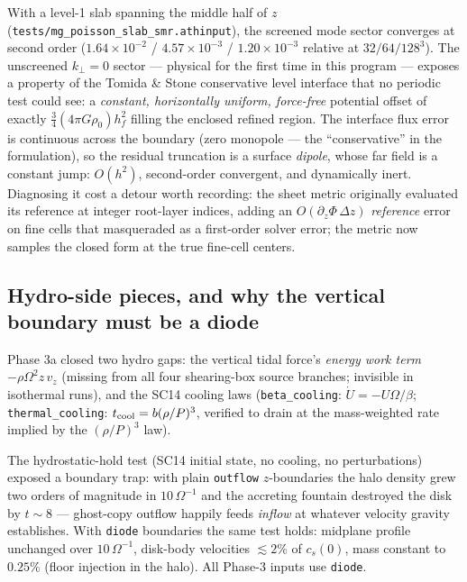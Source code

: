 \documentclass[11pt]{article}
\newcommand{\code}[1]{\texttt{#1}}
\newcommand{\file}[1]{\texttt{#1}}
\newcommand{\Om}{\Omega}
\begin{document}
With a level-1 slab spanning the middle half of $z$
(\file{tests/mg\_poisson\_slab\_smr.athinput}), the screened mode sector converges
at second order ($1.64\times10^{-2}$ / $4.57\times10^{-3}$ / $1.20\times10^{-3}$
relative at $32/64/128^3$). The unscreened $k_\perp = 0$ sector --- physical for
the first time in this program --- exposes a property of the Tomida \& Stone
conservative level interface that no periodic test could see: a \emph{constant,
horizontally uniform, force-free} potential offset of exactly
$\tfrac34(4\pi G\rho_0)h_f^2$ filling the enclosed refined region. The interface
flux error is continuous across the boundary (zero monopole --- the
``conservative'' in the formulation), so the residual truncation is a surface
\emph{dipole}, whose far field is a constant jump: $O(h^2)$, second-order
convergent, and dynamically inert. Diagnosing it cost a detour worth recording:
the sheet metric originally evaluated its reference at integer root-layer
indices, adding an $O(\partial_z\Phi\,\Delta z)$ \emph{reference} error on fine
cells that masqueraded as a first-order solver error; the metric now samples the
closed form at the true fine-cell centers.

\subsection{Hydro-side pieces, and why the vertical boundary must be a diode}

Phase 3a closed two hydro gaps: the vertical tidal force's \emph{energy work
term} $-\rho\Om^2 z\,v_z$ (missing from all four shearing-box source branches;
invisible in isothermal runs), and the SC14 cooling laws
(\code{beta\_cooling}: $\dot U = -U\Om/\beta$; \code{thermal\_cooling}:
$t_{\rm cool} = b(\rho/P)^3$, verified to drain at the mass-weighted rate implied
by the $(\rho/P)^3$ law).

The hydrostatic-hold test (SC14 initial state, no cooling, no perturbations)
exposed a boundary trap: with plain \code{outflow} $z$-boundaries the halo
density grew two orders of magnitude in $10\,\Om^{-1}$ and the accreting fountain
destroyed the disk by $t\sim8$ --- ghost-copy outflow happily feeds \emph{inflow}
at whatever velocity gravity establishes. With \code{diode} boundaries the same
test holds: midplane profile unchanged over $10\,\Om^{-1}$, disk-body velocities
$\lesssim 2\%$ of $c_s(0)$, mass constant to $0.25\%$ (floor injection in the
halo). All Phase-3 inputs use \code{diode}.
\end{document}
